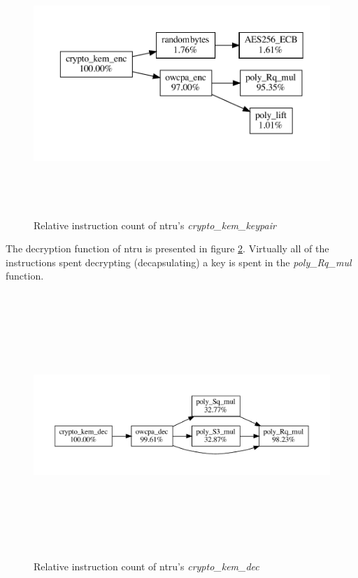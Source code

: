 \begin{figure}[H]
    \centering
    \includegraphics[width=15cm, height=10cm, keepaspectratio]{chapters/results/hot-paths/ntru/crypto_kem_enc.pdf}
    \caption{Relative instruction count of \gls{ntru}'s \textit{crypto\_kem\_keypair}}
    \label{figure:result:hot-paths:ntru:crypto_kem_enc}
\end{figure}

The decryption function of \gls{ntru} is presented in figure \ref{figure:result:hot-paths:ntru:crypto_kem_dec}. Virtually all of the instructions spent decrypting (decapsulating) a key is spent in the \textit{poly\_Rq\_mul} function.

\begin{figure}[H]
    \centering
    \includegraphics[width=15cm, height=10cm, keepaspectratio]{chapters/results/hot-paths/ntru/crypto_kem_dec.pdf}
    \caption{Relative instruction count of \gls{ntru}'s \textit{crypto\_kem\_dec}}
    \label{figure:result:hot-paths:ntru:crypto_kem_dec}
\end{figure}

